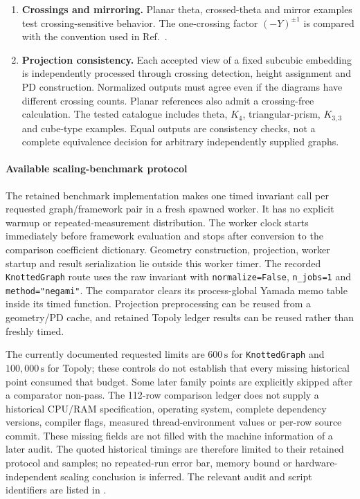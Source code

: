 \begin{enumerate}[leftmargin=*,label=\textbf{(\arabic*)}]
\item \textbf{Crossings and mirroring.} Planar theta, crossed-theta and mirror examples test crossing-sensitive behavior. The one-crossing factor $(-Y)^{\pm1}$ is compared with the convention used in Ref.~\cite{kg_peddada2023}.

\item \textbf{Projection consistency.} Each accepted view of a fixed subcubic embedding is independently processed through crossing detection, height assignment and PD construction. Normalized outputs must agree even if the diagrams have different crossing counts. Planar references also admit a crossing-free calculation. The tested catalogue includes theta, $K_4$, triangular-prism, $K_{3,3}$ and cube-type examples. Equal outputs are consistency checks, not a complete equivalence decision for arbitrary independently supplied graphs.
\end{enumerate}

\paragraph{Available scaling-benchmark protocol}
The retained benchmark implementation makes one timed invariant call per requested graph/framework pair in a fresh spawned worker. It has no explicit warmup or repeated-measurement distribution. The worker clock starts immediately before framework evaluation and stops after conversion to the comparison coefficient dictionary. Geometry construction, projection, worker startup and result serialization lie outside this worker timer. The recorded \texttt{KnottedGraph} route uses the raw invariant with \texttt{normalize=False}, \texttt{n\_jobs=1} and \texttt{method="negami"}. The comparator clears its process-global Yamada memo table inside its timed function. Projection preprocessing can be reused from a geometry/PD cache, and retained Topoly ledger results can be reused rather than freshly timed.

The currently documented requested limits are $600\,\mathrm{s}$ for \texttt{KnottedGraph} and $100{,}000\,\mathrm{s}$ for Topoly; these controls do not establish that every missing historical point consumed that budget. Some later family points are explicitly skipped after a comparator non-pass. The 112-row comparison ledger does not supply a historical CPU/RAM specification, operating system, complete dependency versions, compiler flags, measured thread-environment values or per-row source commit. These missing fields are not filled with the machine information of a later audit. The quoted historical timings are therefore limited to their retained protocol and samples; no repeated-run error bar, memory bound or hardware-independent scaling conclusion is inferred. The relevant audit and script identifiers are listed in .

